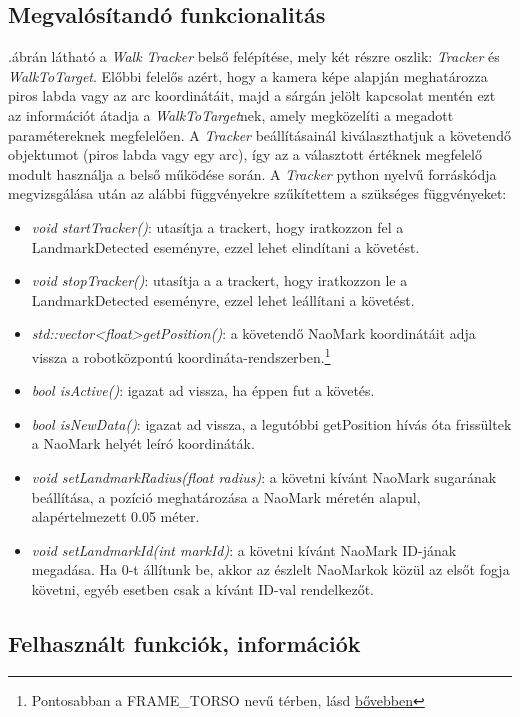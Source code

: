 \documentclass{article}
\numberwithin{figure}{section}
\newcommand{\Figref}[1]{\Aref{fig:#1}.ábr}
\newenvironment{compactlist}
{ \begin{itemize}
    \setlength{\itemsep}{0pt}
    \setlength{\parskip}{0pt}
    \setlength{\parsep}{0pt}
	\setlength{\topsep}{0pt}
}
{ \end{itemize}}
\begin{document}
\begin{sloppypar}
		\subsection{Megvalósítandó funkcionalitás}
		\Figref{walktracker}án látható a \textit{Walk Tracker} belső felépítése, mely két részre oszlik: \textit{Tracker} és \textit{WalkToTarget}. Előbbi felelős azért, hogy a kamera képe alapján meghatározza piros labda vagy az arc koordinátáit, majd a sárgán jelölt kapcsolat mentén ezt az információt átadja a \textit{WalkToTarget}nek, amely megközelíti a megadott paramétereknek megfelelően. A \textit{Tracker} beállításainál kiválaszthatjuk a követendő objektumot (piros labda vagy egy arc), így az a választott értéknek megfelelő modult használja a belső működése során. A \textit{Tracker} python nyelvű forráskódja megvizsgálása után az alábbi függvényekre szűkítettem a szükséges függvényeket:
		\begin{compactlist}
			\item \textit{void startTracker()}: utasítja a trackert, hogy iratkozzon fel a LandmarkDetected eseményre, ezzel lehet elindítani a követést.
			\item \textit{void stopTracker()}: utasítja a a trackert, hogy iratkozzon le a LandmarkDetected eseményre, ezzel lehet leállítani a követést.
			\item \textit{std::vector\textless float\textgreater getPosition()}: a követendő NaoMark koordinátáit adja vissza a robotközpontú koordináta-rendszerben.\footnote{Pontosabban a FRAME\_TORSO nevű térben, lásd \href{http://doc.aldebaran.com/1-14/naoqi/motion/control-cartesian.html?highlight=frame_torso}{bővebben}}
			\item \textit{bool isActive()}: igazat ad vissza, ha éppen fut a követés.
			\item \textit{bool isNewData()}: igazat ad vissza, a legutóbbi getPosition hívás óta frissültek a NaoMark helyét leíró koordináták.
			\item \textit{void setLandmarkRadius(float radius)}: a követni kívánt NaoMark sugarának beállítása, a pozíció meghatározása a NaoMark méretén alapul, alapértelmezett 0.05 méter.
			\item \textit{void setLandmarkId(int markId)}: a követni kívánt NaoMark ID-jának megadása. Ha 0-t állítunk be, akkor az észlelt NaoMarkok közül az elsőt fogja követni, egyéb esetben csak a kívánt ID-val rendelkezőt.
		\end{compactlist}
		
		\subsection{Felhasznált funkciók, információk}

\end{sloppypar}
\end{document}
